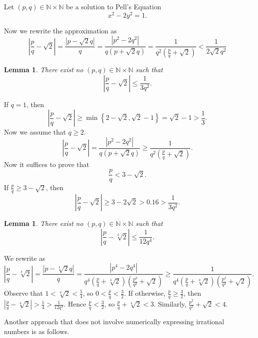 \documentclass[11pt]{article}
\newtheorem{lemma}[thm]{Lemma}
\theoremstyle{definition}
\newcommand{\set}[1]{\left\{ #1 \right\}}
\newcommand{\nl}[0]{\vspace{12pt}}
\newcommand{\abs}[1]{\left\lvert#1\right\rvert} %
\newcommand{\NN}{\mathbb{N}}
\begin{document}
	Let $(p,q) \in \NN\times\NN$ be a solution to Pell's Equation
	$$ x^2 - 2y^2 = 1 . $$

	Now we rewrite the approximation as 
	\[
		\abs{\frac{p}{q} - \sqrt2} = \frac{\abs{p-\sqrt2 q}}{q} 
		= \frac{\abs{p^2 - 2q^2}}{q(p+\sqrt2 q)}
		= \frac1{q^2\left(\frac{p}{q}+\sqrt2\right)}
		< \frac1{2\sqrt2 q^2}
	\]
\qedhere

\begin{lemma}
	There exist no $(p,q) \in \NN\times\NN$ such that 
	$$ \abs{\frac{p}{q} - \sqrt2} \le \frac1{3q^2} . $$
\end{lemma}
\proof
	If $q = 1$, then 
	$$ \abs{\frac{p}{q} - \sqrt2} \ge \min\set{2-\sqrt2, \sqrt2-1} = \sqrt2-1 > \frac13 . $$
	Now we assume that $q \ge 2$. 
	\[
		\abs{\frac{p}{q}-\sqrt2} = \frac{\abs{p^2-2q^2}}{q(p+\sqrt2 q)}
		\ge \frac1{q^2\left(\frac{p}{q} + \sqrt2\right)} .
	\]
	Now it suffices to prove that 
	$$ \frac{p}{q} < 3-\sqrt2 . $$
	If $\frac{p}{q} \ge 3-\sqrt2$, then 
	$$ \abs{\frac{p}{q}-\sqrt2} \ge 3-2\sqrt2 > 0.16 > \frac1{3q^2} . $$
\qedhere

\begin{lemma}
	There exist no $(p,q)\in\NN\times\NN$ such that 
	$$ \abs{\frac{p}{q} - \sqrt[4]2} \le \frac1{12q^4} . $$
\end{lemma}
\proof
	We rewrite as 
	\[
		\abs{\frac{p}{q} - \sqrt[4]2} = \frac{\abs{p-\sqrt[4]2 q}}{q} 
		= \frac{\abs{p^4 - 2q^4}}{q^4 \left(\frac{p}{q} + \sqrt[4]{2}\right)\left(\frac{p^2}{q^2} + \sqrt{2}\right)}
		\ge \frac1{q^4 \left(\frac{p}{q} + \sqrt[4]{2}\right) \left(\frac{p^2}{q^2} + \sqrt{2} \right)} .
	\]
	Observe that 
	$ 1 < \sqrt[4]2 < \frac54 $, so $0 < \frac{p}{q} < \frac32$.
	If otherwise, $\frac{p}{q} \ge \frac32$, then $\abs{\frac{p}{q}-\sqrt[4]{2}} > \frac14 > \frac1{12q^4}$.
	Hence $\frac{p}{q} < \frac32$, so $\frac{p}{q} + \sqrt[4]{2} < 3$. 
	Similarly, $\frac{p^2}{q^2} + \sqrt2 < 4$. 
\qedhere

\nl
	Another approach that does not involve numerically expressing irrational numbers is as follows.
\end{document}
